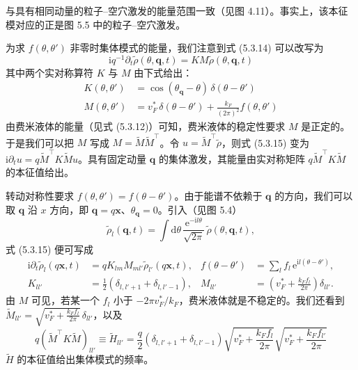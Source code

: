 与具有相同动量的粒子--空穴激发的能量范围一致（见图 4.11）。事实上，该本征模对应的正是图 5.5 中的粒子--空穴激发。

为求 $f(\theta,\theta')$ 非零时集体模式的能量，我们注意到式 (5.3.14) 可以改写为
\begin{equation*}
\mathrm{i}q^{-1}\partial_{t}\tilde{\rho}(\theta,\pmb{q},t)=KM\tilde{\rho}(\theta,\pmb{q},t) \tag{5.3.15}
\end{equation*}
其中两个实对称算符 $K$ 与 $M$ 由下式给出：
\begin{align*}
K(\theta,\theta') &= \cos(\theta_{\pmb{q}}-\theta)\,\delta(\theta-\theta')\\
M(\theta,\theta') &= v_{F}^{*}\,\delta(\theta-\theta')+\frac{k_{F}}{(2\pi)^{2}}f(\theta,\theta') \tag{5.3.16}
\end{align*}
由费米液体的能量（见式 (5.3.12)）可知，费米液体的稳定性要求 $M$ 是正定的。于是我们可以把 $M$ 写成 $M=\tilde{M}\tilde{M}^{\top}$。令 $u=\tilde{M}^{\top}\tilde{\rho}$，则式 (5.3.15) 变为 $\mathrm{i}\partial_{t}u=q\tilde{M}^{\top}K\tilde{M}u$。具有固定动量 $\pmb{q}$ 的集体激发，其能量由实对称矩阵 $q\tilde{M}^{\top}K\tilde{M}$ 的本征值给出。

转动对称性要求 $f(\theta,\theta')=f(\theta-\theta')$。由于能谱不依赖于 $\pmb{q}$ 的方向，我们可以取 $\pmb{q}$ 沿 $x$ 方向，即 $\pmb{q}=q\pmb{x}$、$\theta_{\pmb{q}}=0$。引入（见图 5.4）
\begin{equation*}
\tilde{\rho}_{l}(\pmb{q},t)=\int \mathrm{d}\theta\,\frac{\mathrm{e}^{-\mathrm{i}l\theta}}{\sqrt{2\pi}}\,\tilde{\rho}(\theta,\pmb{q},t),
\end{equation*}
式 (5.3.15) 便可写成
\begin{align*}
\mathrm{i}\partial_{t}\tilde{\rho}_{l}(q\pmb{x},t) &= qK_{lm}M_{ml'}\tilde{\rho}_{l'}(q\pmb{x},t), & f(\theta-\theta') &= \sum_{l}f_{l}\,\mathrm{e}^{\mathrm{i}l(\theta-\theta')},\\
K_{ll'} &= \frac{1}{2}\left(\delta_{l,l'+1}+\delta_{l,l'-1}\right), & M_{ll'} &= \left(v_{F}^{*}+\frac{k_{F}f_{l}}{2\pi}\right)\delta_{ll'}.
\end{align*}
由 $M$ 可见，若某一个 $f_{l}$ 小于 $-2\pi v_{F}^{*}/k_{F}$，费米液体就是不稳定的。我们还看到 $\tilde{M}_{ll'}\allowbreak=\sqrt{v_{F}^{*}+\frac{k_{F}f_{l}}{2\pi}}\,\delta_{ll'}$，以及
\begin{equation*}
q(\tilde{M}^{\top}K\tilde{M})_{ll'}\equiv\tilde{H}_{ll'}=\frac{q}{2}\left(\delta_{l,l'+1}+\delta_{l,l'-1}\right)\sqrt{v_{F}^{*}+\frac{k_{F}f_{l}}{2\pi}}\sqrt{v_{F}^{*}+\frac{k_{F}f_{l'}}{2\pi}}
\end{equation*}
$\tilde{H}$ 的本征值给出集体模式的频率。


